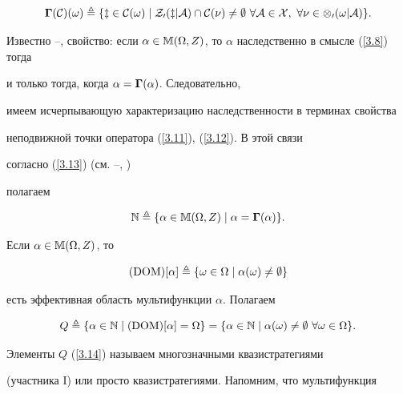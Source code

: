 \begin{equation}\label{3.12}


{\mG}(\cal{C})(\omega) \triangleq \{z \in \cal{C}(\omega) \mid


{Z_0}(z \vert A) \cap \cal{C}(\nu) \ne \emp \ \fo{A} \in


\cal{X}, \ \fo{\nu} \in {{\Om}_0}(\omega \vert A)\}.


\end{equation}


Известно \cite{23}--\cite{26}, \cite{55} свойство: если $\alpha \in


\Bbb{M}(\Om,Z)$, то $\alpha$ наследственно в смысле (\ref{3.8}) тогда


и только тогда, когда $\alpha = {\boldsymbol\Gamma}(\alpha)$. Следовательно,


имеем исчерпывающую характеризацию наследственности в терминах свойства


неподвижной точки оператора (\ref{3.11}), (\ref{3.12}). В этой связи


согласно (\ref{3.13}) (см. \cite{23}--\cite{26}, \cite{55}) 


полагаем


\begin{equation}\label{3.13}


\Bbb{N} \triangleq \{\alpha \in \Bbb{M}(\Om,Z) \mid \alpha =


{\mG}(\alpha)\}.


\end{equation}


Если $\alpha \in\Bbb{M}(\Omega,Z)$, то


$$


(\DOM)[\alpha] \triangleq \{\omega \in \Om \mid


{\alpha}(\omega) \ne \emp\}


$$


есть эффективная область мультифункции $\alpha$. Полагаем


\begin{equation}\label{3.14}


Q \triangleq \{\alpha \in \Bbb{N} \mid (\DOM)[\alpha] = \Om\} =


\{\alpha \in \Bbb{N} \mid {{\alpha}(\omega)} \ne


\emp \ \fo{\omega} \in \Om\}.


\end{equation}


Элементы $Q$ (\ref{3.14}) называем многозначными квазистратегиями


(участника I) или просто квазистратегиями. Напомним, что мультифункция


